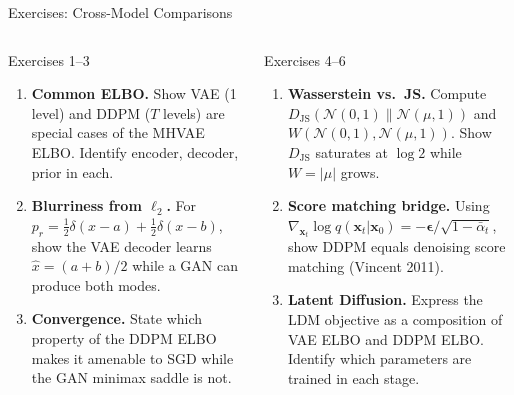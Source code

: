 \documentclass[aspectratio=169,11pt]{beamer}
\newcommand{\Norm}{\mathcal{N}}
\newcommand{\bx}{\bm{x}}
\newcommand{\beps}{\bm{\epsilon}}
\newcommand{\JS}{D_{\mathrm{JS}}} %
\begin{document}
\begin{frame}{Exercises: Cross-Model Comparisons}
\begin{columns}[T]
\begin{block}{Exercises 1--3}
\footnotesize
\begin{enumerate}
  \setlength\itemsep{4pt}
  \item \textbf{Common ELBO.}
        Show VAE (1 level) and DDPM ($T$ levels) are special cases of
        the MHVAE ELBO. Identify encoder, decoder, prior in each.

  \item \textbf{Blurriness from $\ell_2$.}
        For $p_r=\tfrac{1}{2}\delta(x\!-\!a)+\tfrac{1}{2}\delta(x\!-\!b)$,
        show the VAE decoder learns $\hat x=(a+b)/2$
        while a GAN can produce both modes.

  \item \textbf{Convergence.}
        State which property of the DDPM ELBO makes it amenable to SGD
        while the GAN minimax saddle is not.
\end{enumerate}
\end{block}

\begin{block}{Exercises 4--6}
\footnotesize
\begin{enumerate}
  \setlength\itemsep{4pt}
  \setcounter{enumi}{3}
  \item \textbf{Wasserstein vs.\ JS.}
        Compute $\JS(\Norm(0,1)\|\Norm(\mu,1))$ and $W(\Norm(0,1),\Norm(\mu,1))$.
        Show $\JS$ saturates at $\log 2$ while $W=|\mu|$ grows.

  \item \textbf{Score matching bridge.}
        Using $\nabla_{\bx_t}\log q(\bx_t|\bx_0)=-\beps/\sqrt{1-\bar\alpha_t}$,
        show DDPM equals denoising score matching (Vincent 2011).

  \item \textbf{Latent Diffusion.}
        Express the LDM objective as a composition of VAE ELBO and DDPM ELBO.
        Identify which parameters are trained in each stage.
\end{enumerate}
\end{block}
\end{columns}
\end{frame}
\end{document}
